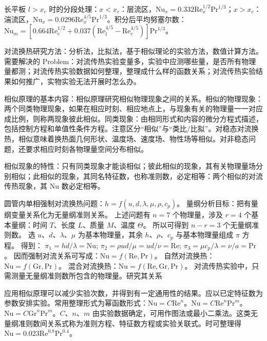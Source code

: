 长平板 $l>x_c$ 时的分段处理：$x<x_c$：层流区，$\mathrm{Nu}_x=0.332\mathrm{Re}_x^{1/2}\mathrm{Pr}^{1/3}$；$x>x_c$：湍流区，$\mathrm{Nu}_x=0.0296\mathrm{Re}_x^{4/5}\mathrm{Pr}^{1/3}$。积分后平均努塞尔数：$\mathrm{Nu}_m=[0.664\mathrm{Re}_c^{1/2}+0.037(\mathrm{Re}_l^{4/5}-\mathrm{Re}_c^{4/5})]\mathrm{Pr}^{1/3}$。

\divider


对流换热研究方法：分析法，比拟法，基于相似理论的实验方法，数值计算方法。
需要解决的 Problem：对流传热实验变量多，实验中应测哪些量，是否所有物理量都测；对流传热实验数据如何整理，整理成什么样的函数关系；对流传热实验结果如何推广，实物实验无法开展时怎么办。

相似原理的基本内容：相似原理研究相似物理现象之间的关系。相似的物理现象：两个同类物理现象，如果在相应时刻、相应地点上，与现象有关的物理量一一对应成比例，则称两现象彼此相似。同类现象：由相同形式和内容的微分方程式描述，包括控制方程和单值性条件方程。注意区分“相似”与“类比/比拟”。对稳态对流换热，相似意味着换热面几何形状、温度场、速度场、物性场等相似。对非稳态问题，还要求相应时刻各物理量空间分布相似。

相似现象的特性：只有同类现象才能谈相似；彼此相似的现象，其有关物理量场分别相似；此相似的现象，其同名特征数，也称准则数，必定相等：两个相似的对流传热现象，其 $\mathrm{Nu}$ 数必定相等。

圆管内单相强制对流换热问题：$h=f(u,d,\lambda,\mu,\rho,c_p)$。
量纲分析目标：把有量纲变量关系化为无量纲准则关系。
上述问题有 $n=7$ 个物理量，涉及 $r=4$ 个基本量纲：时间 $T$、长度 $L$、质量 $M$、温度 $\Theta$。
所以可得到 $n-r=3$ 个无量纲准则数。
选 $u$、$d$、$\lambda$、$\mu$ 为基本物理量，其余 $h$、$\rho$、$c_p$ 与基本物理量组成 $\pi$ 方程。
得到：
$\pi_1=hd/\lambda=\mathrm{Nu}$;
$\pi_2=\rho ud/\mu=ud/\nu=\mathrm{Re}$;
$\pi_3=\mu c_p/\lambda=\nu/a=\mathrm{Pr}$。
因而强制对流关系可写成：$\mathrm{Nu}=f(\mathrm{Re},\mathrm{Pr})$。
自然对流换热：$\mathrm{Nu}=f(\mathrm{Gr},\mathrm{Pr})$。
混合对流换热：$\mathrm{Nu}=f(\mathrm{Re},\mathrm{Gr},\mathrm{Pr})$。
对流传热实验中，只需测量无量纲准则数所包含的物理量。研究其关系

应用相似原理可以减少实验次数，并得到有一定通用性的结果。应以已定特征数为参数安排实验。常用整理形式为幂函数形式：$\mathrm{Nu}=C\mathrm{Re}^n$。$\mathrm{Nu}=C\mathrm{Re}^n\mathrm{Pr}^m$。$\mathrm{Nu}=C\mathrm{Gr}^n\mathrm{Pr}^m$。$C$、$n$、$m$ 由实验数据确定，可用作图法或最小二乘法。这类无量纲准则数间关系式称为准则方程、特征数方程或实验关联式。时可整理得 $\mathrm{Nu}=0.023\mathrm{Re}^{0.8}\mathrm{Pr}^{0.4}$。


